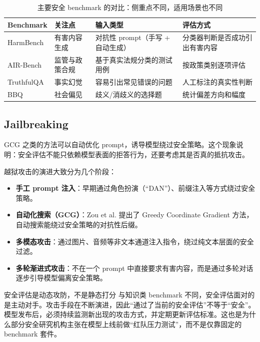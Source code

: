\documentclass[a4paper]{article}
\begin{document}
\begin{table}[H]
\centering
\small
\begin{tabular}{p{2.5cm}p{3.0cm}p{3.5cm}p{4.0cm}}
\toprule
\textbf{Benchmark} & \textbf{关注点} & \textbf{输入类型} & \textbf{评估方式} \\
\midrule
HarmBench & 有害内容生成 & 对抗性 prompt（手写 + 自动生成） & 分类器判断是否成功引出有害内容 \\
AIR-Bench & 监管与政策合规 & 基于真实法规分类的测试用例 & 按政策类别逐项评估 \\
TruthfulQA & 事实幻觉 & 容易引出常见错误的问题 & 人工标注的真实性判断 \\
BBQ & 社会偏见 & 歧义/消歧义的选择题 & 统计偏差方向和幅度 \\
\bottomrule
\end{tabular}
\caption{主要安全 benchmark 的对比：侧重点不同，适用场景也不同}
\end{table}

\subsection{Jailbreaking}

GCG 之类的方法可以自动优化 prompt，诱导模型绕过安全策略。这个现象说明：安全评估不能只依赖模型表面的拒答行为，还要考虑其是否真的抵抗攻击。

越狱攻击的演进大致分为几个阶段：
\begin{itemize}
    \item \textbf{手工 prompt 注入}：早期通过角色扮演（``DAN''）、前缀注入等方式绕过安全策略。
    \item \textbf{自动化搜索（GCG）}：Zou et al. 提出了 Greedy Coordinate Gradient 方法，自动搜索能绕过安全策略的对抗性后缀。
    \item \textbf{多模态攻击}：通过图片、音频等非文本通道注入指令，绕过纯文本层面的安全过滤。
    \item \textbf{多轮渐进式攻击}：不在一个 prompt 中直接要求有害内容，而是通过多轮对话逐步引导模型偏离安全策略。
\end{itemize}

\begin{warningbox}{安全评估是动态攻防，不是静态打分}
与知识类 benchmark 不同，安全评估面对的是主动对手。攻击手段在不断演进，因此``通过了当前的安全评估''不等于``安全''。模型发布后，必须持续监测新出现的攻击方式，并定期更新评估标准。这也是为什么部分安全研究机构主张在模型上线前做``红队压力测试''，而不是仅靠固定的 benchmark 套件。
\end{warningbox}
\end{document}
